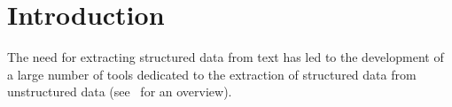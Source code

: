\section{Introduction}
The need for extracting structured data from text has led to the development of a large number of tools dedicated to the extraction of structured data from unstructured data (see~\cite{GERBIL} for an overview).
%
